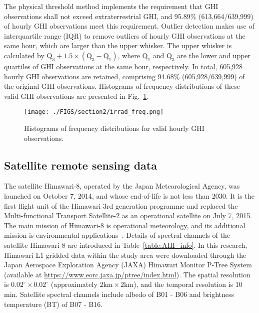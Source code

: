 \documentclass[review]{elsarticle}
\begin{document}
The physical threshold method implements the requirement that GHI observations shall not exceed extraterrestrial GHI, and 95.89\% (613,664/639,999) of hourly GHI observations meet this requirement.
Outlier detection makes use of interquartile range (IQR) to remove outliers of hourly GHI observations at the same hour, which are larger than the upper whisker.
The upper whisker is calculated by $\mathrm{Q_3+1.5\times(Q_3-Q_1)}$, where $\mathrm{Q_1}$ and $\mathrm{Q_3}$ are the lower and upper quartiles of GHI observations at the same hour, respectively.
In total, 605,928 hourly GHI observations are retained, comprising 94.68\% (605,928/639,999) of the original GHI observations.
Histograms of frequency distributions of these valid GHI observations are presented in Fig.~\ref{fig:irrad_freq}.

\begin{figure}[H]
    \centering
    \vspace{-0mm}
    \texttt{[image: ./FIGS/section2/irrad\_freq.png]}
    \caption{Histograms of frequency distributions for valid hourly GHI observations.}
    \label{fig:irrad_freq}
\end{figure}

\subsection{Satellite remote sensing data}
\label{datasets:Satellite}
The satellite Himawari-8, operated by the Japan Meteorological Agency, was launched on October 7, 2014, and whose end-of-life is not less than 2030. It is the first flight unit of the Himawari 3rd generation programme and replaced the Multi-functional Transport Satellite-2 as an operational satellite on July 7, 2015.
The main mission of Himawari-8 is operational meteorology, and its additional mission is environmental applications~\citep{ZHANG2023103506, HU2020102153, ZHAO2022102933}.
Details of spectral channels of the satellite Himawari-8 are introduced in Table~\ref{table:AHI_info}.
In this research, Himawari L1 gridded data within the study area were downloaded through the Japan Aerospace Exploration Agency (JAXA) Himawari Monitor P-Tree System (available at \href{https://www.eorc.jaxa.jp/ptree/index.html}{https://www.eorc.jaxa.jp/ptree/index.html}).
The spatial resolution is $0.02^{\circ}\times0.02^{\circ}$ (approximately $\mathrm{2km \times 2km}$), and the temporal resolution is 10 min.
Satellite spectral channels include albedo of B01 - B06 and brightness temperature (BT) of B07 - B16.
\end{document}
